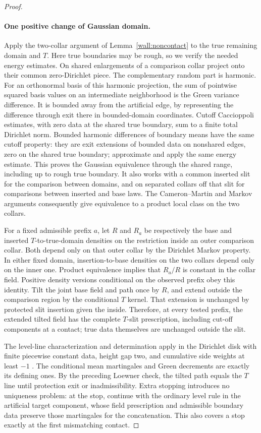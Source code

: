 \begin{proof}
\paragraph{One positive change of Gaussian domain.}
Apply the two-collar argument of Lemma~\ref{wall:noncontact} to the true remaining domain and $T$.  Here true boundaries may be rough, so we verify the needed energy estimates.  On shared enlargements of a comparison collar project onto their common zero-Dirichlet piece.  The complementary random part is harmonic.  For an orthonormal basis of this harmonic projection, the sum of pointwise squared basis values on an intermediate neighborhood is the Green variance difference.  It is bounded away from the artificial edge, by representing the difference through exit there in bounded-domain coordinates.  Cutoff Caccioppoli estimates, with zero data at the shared true boundary, sum to a finite total Dirichlet norm.  Bounded harmonic differences of boundary means have the same cutoff property: they are exit extensions of bounded data on nonshared edges, zero on the shared true boundary; approximate and apply the same energy estimate.  This proves the Gaussian equivalence through the shared range, including up to rough true boundary.  It also works with a common inserted slit for the comparison between domains, and on separated collars off that slit for comparisons between inserted and base laws.  The Cameron--Martin and Markov arguments consequently give equivalence to a product local class on the two collars.

For a fixed admissible prefix $a$, let $R$ and $R_a$ be respectively the base and inserted $T$-to-true-domain densities on the restriction inside an outer comparison collar.  Both depend only on that outer collar by the Dirichlet Markov property.  In either fixed domain, insertion-to-base densities on the two collars depend only on the inner one.  Product equivalence implies that $R_a/R$ is constant in the collar field.  Positive density versions conditional on the observed prefix obey this identity.  Tilt the joint base field and path once by $R$, and extend outside the comparison region by the conditional $T$ kernel.  That extension is unchanged by protected slit insertion given the inside.  Therefore, at every tested prefix, the extended tilted field has the complete $T$-slit prescription, including cut-off components at a contact; true data themselves are unchanged outside the slit.

The level-line characterization and determination apply in the Dirichlet disk
with finite piecewise constant data, height gap two, and cumulative side
weights at least $-1$ \cite[Theorems~1.1.1--1.1.3 and Proposition~2.1.7]{WangWu}.  The conditional mean martingales and Green decrements are exactly its defining ones.  By the preceding Loewner check, the tilted path equals the $T$ line until protection exit or inadmissibility.  Extra stopping introduces no uniqueness problem: at the stop, continue with the ordinary level rule in the artificial target component, whose field prescription and admissible boundary data preserve those martingales for the concatenation.  This also covers a stop exactly at the first mismatching contact.


\end{proof}

